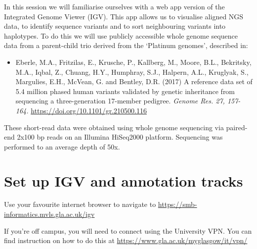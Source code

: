 \documentclass[
  letterpaper,
  DIV=11,
  numbers=noendperiod]{scrreprt}
\providecommand{\tightlist}{%
  \setlength{\itemsep}{0pt}\setlength{\parskip}{0pt}}
\begin{document}
In this session we will familiarise ourselves with a web app version of
the Integrated Genome Viewer (IGV). This app allows us to visualise
aligned NGS data, to identify sequence variants and to sort neighbouring
variants into haplotypes. To do this we will use publicly accessible
whole genome sequence data from a parent-child trio derived from the
`Platinum genomes', described in:

\begin{itemize}
\tightlist
\item
  Eberle, M.A., Fritzilas, E., Krusche, P., Kallberg, M., Moore, B.L.,
  Bekritsky, M.A., Iqbal, Z., Chuang, H.Y., Humphray, S.J., Halpern,
  A.L., Kruglyak, S., Margulies, E.H., McVean, G. and Bentley, D.R.
  (2017) A reference data set of 5.4 million phased human variants
  validated by genetic inheritance from sequencing a three-generation
  17-member pedigree. \emph{Genome Res. 27, 157-164.}
  \href{https://genome.cshlp.org/content/27/1/157}{https://doi.org/10.1101/gr.210500.116}
\end{itemize}

These short-read data were obtained using whole genome sequencing via
paired-end 2x100 bp reads on an Illumina HiSeq2000 platform. Sequencing
was performed to an average depth of 50x.


\chapter{Set up IGV and annotation
tracks}\label{set-up-igv-and-annotation-tracks}

Use your favourite internet browser to navigate to
\url{https://smb-informatics.mvls.gla.ac.uk/igv}

\begin{tcolorbox}[enhanced jigsaw, arc=.35mm, bottomrule=.15mm, bottomtitle=1mm, breakable, colback=white, colbacktitle=quarto-callout-warning-color!10!white, colframe=quarto-callout-warning-color-frame, coltitle=black, left=2mm, leftrule=.75mm, opacityback=0, opacitybacktitle=0.6, rightrule=.15mm, title=\textcolor{quarto-callout-warning-color}{\faExclamationTriangle}\hspace{0.5em}{Warning}, titlerule=0mm, toprule=.15mm, toptitle=1mm]

If you're off campus, you will need to connect using the University VPN.
You can find instruction on how to do this at
\url{https://www.gla.ac.uk/myglasgow/it/vpn/}

\end{tcolorbox}
\end{document}
